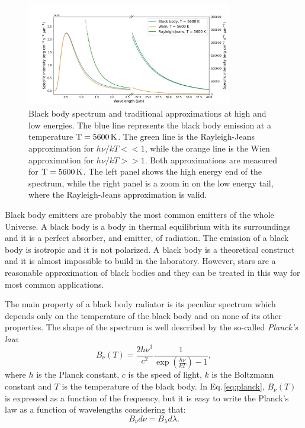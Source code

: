 \documentclass[../main.tex]{subfiles}
\begin{document}
\begin{figure}
\centering
\includegraphics[width=0.8\textwidth]{images/BB.jpg} 
\caption[]{Black body spectrum and traditional approximations at high and low energies. The blue line represents the black body emission at a temperature $\rm T = 5600\,\si{K}$. The green line is the Rayleigh-Jeans approximation for $h\nu/kT<<1$, while the orange line is the Wien approximation for $h\nu/kT>>1$. Both approximations are measured for $\rm T = 5600\,\si{K}$. The left panel shows the high energy end of the spectrum, while the right panel is a zoom in on the low energy tail, where the Rayleigh-Jeans approximation  is valid.}
\label{fig:BB_emission}
\end{figure}

Black body emitters are probably the most common emitters of the whole Universe.
A black body is a body in thermal equilibrium with its surroundings and it is a perfect absorber, and emitter, of radiation.
The emission of a black body is isotropic and it is not polarized.
A black body is a theoretical construct and it is almost impossible to build in the laboratory.
However, stars are a reasonable approximation of black bodies and they can be treated in this way for most common applications.

The main property of a black body radiator is its peculiar spectrum which depends only on the temperature of the black body and on none of its other properties.
The shape of the spectrum is well described by the so-called \emph{Planck's law}:
\begin{equation}
    \label{eq:planck}
    B_{\nu}(T) = \frac{2h\nu^3}{c^2}\frac{1}{\exp{\left(\frac{h\nu}{kT}\right)} - 1},
\end{equation}
where $h$ is the Planck constant, $c$ is the speed of light, $k$ is the Boltzmann constant and $T$ is the temperature of the black body.
In Eq.\,\ref{eq:planck}, $B_{\nu}(T)$ is expressed as a function of the frequency, but it is easy to write the Planck's law as a function of wavelengths considering that:
\begin{equation}
    \label{eq:transform}
    B_{\nu}d\nu = B_{\lambda}d\lambda.
\end{equation}
\end{document}
